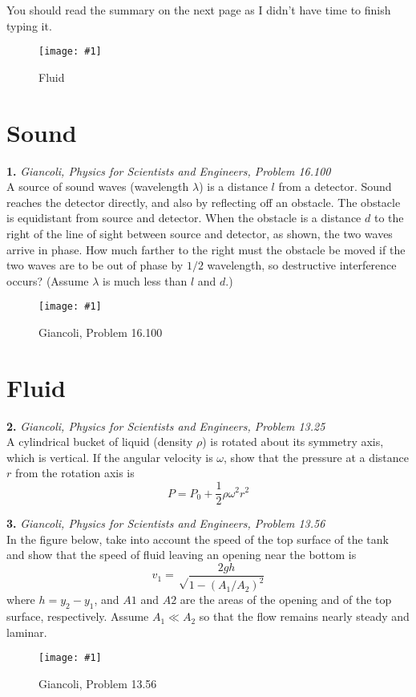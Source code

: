 \documentclass[11pt]{article}
\newcommand{\fig}[4]{
    \begin{figure}[H]
        \centering
        \texttt{[image: \#1]}
        \caption{#2}
        \label{exp4fit}
    \end{figure}
}
\theoremstyle{gangnamstyle}{\newtheorem{definition}{Definition}[]}
\theoremstyle{gangnamstyle}{\newtheorem{example}{Example}[]}
\theoremstyle{gangnamstyle}{\newtheorem{problem}{Problem}[]}
\begin{document}
You should read the summary on the next page as I didn't have time to finish typing it. 

\fig{figs/0801/sum.png}{Fluid}{0.55}{0}

\pagebreak

\section{Sound}

\textbf{1.} \textit{Giancoli, Physics for Scientists and Engineers, Problem 16.100} \\
A source of sound waves (wavelength $\lambda$) is a distance $l$ from a detector. Sound reaches the detector directly, and also by reflecting off an obstacle. The obstacle is equidistant from source and detector. When the obstacle is a distance $d$ to the right of the line of sight between source and detector, as shown, the two waves arrive in phase. How much farther to the right must the obstacle be moved if the two waves are to be out of phase by $1/2$ wavelength, so destructive interference occurs? (Assume $\lambda$ is much less than $l$ and $d$.)

\fig{figs/0801/g100.png}{Giancoli, Problem 16.100}{0.55}{0}

\pagebreak

\section{Fluid}

\textbf{2.} \textit{Giancoli, Physics for Scientists and Engineers, Problem 13.25} \\
A cylindrical bucket of liquid (density $\rho$) is rotated about its symmetry axis, which is vertical. If the angular velocity is $\omega$, show that the pressure at a distance $r$ from the rotation axis is
\[ P = P_0 + \frac{1}{2}\rho\omega^2 r^2 \]

\pagebreak

\textbf{3.} \textit{Giancoli, Physics for Scientists and Engineers, Problem 13.56} \\
In the figure below, take into account the speed of the top surface of the tank and show that the speed of fluid leaving an opening near the bottom is 
\[ v_1 = \sqrt\frac{2gh}{1 - (A_1 / A_2)^2} \]
where $h = y_2 - y_1$, and $A1$ and $A2$ are the areas of the opening and of the top surface, respectively. Assume $A_1 \ll A_2$ so that the flow remains nearly steady and laminar.

\fig{figs/0801/tank.png}{Giancoli, Problem 13.56}{0.6}{0}
\end{document}
